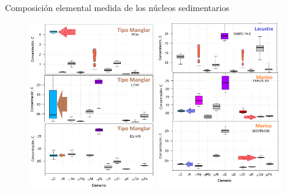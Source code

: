 \documentclass[9pt]{beamer}
\begin{document}
\begin{frame}{Composición elemental medida de los núcleos sedimentarios}
	\begin{figure}
		\centering
		\includegraphics[width=0.48\textwidth]{Imagenes/XRF_Todos_Los_Nucleos_1-3.png}
		\includegraphics[width=0.48\textwidth]{Imagenes/XRF_Todos_Los_Nucleos_2-3.png}
	\end{figure}
\end{frame}
\end{document}
